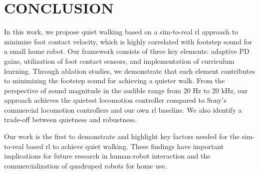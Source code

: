 \section{CONCLUSION}
In this work, we propose quiet walking based on a sim-to-real \ac{rl} approach to minimize foot contact velocity, which is highly correlated with footstep sound for a small home robot. Our framework consists of three key elements: adaptive PD gains, utilization of foot contact sensors, and implementation of curriculum learning. Through ablation studies, we demonstrate that each element contributes to minimizing the footstep sound for achieving a quieter walk. From the perspective of sound magnitude in the audible range from 20 Hz to 20 kHz, our approach achieves the quietest locomotion controller compared to Sony's commercial locomotion controllers and our own \ac{rl} baseline. We also identify a trade-off between quietness and robustness. 

Our work is the first to demonstrate and highlight key factors needed for the sim-to-real based \ac{rl} to achieve quiet walking. These findings have important implications for future research in human-robot interaction and the commercialization of quadruped robots for home use. 


